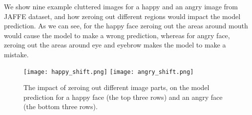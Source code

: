 \documentclass[conference]{IEEEtran}
\begin{document}
We show nine example cluttered images for a happy and an angry image from JAFFE dataset, and how zeroing out different regions would impact the model prediction. 
As we can see, for the happy face zeroing out the areas around mouth would cause the model to make a wrong prediction, whereas for angry face, zeroing out the areas around eye and eyebrow makes the model to make a mistake.
\begin{figure}[h]
\begin{center}
   \texttt{[image: happy\_shift.png]}
   \texttt{[image: angry\_shift.png]}
\end{center}
   \caption{The impact of zeroing out different image parts, on the model prediction for a happy face (the top three rows) and an angry face (the bottom three rows).}
\label{fig:shifting}
\end{figure}
\end{document}
